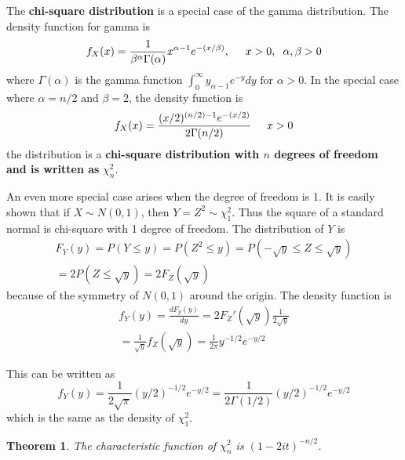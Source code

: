 \documentclass{article}
\newtheorem{theorem}{Theorem}[section]
\begin{document}
The \textbf{chi-square distribution} is a special case of the gamma distribution. The density function for gamma is
\begin{equation*}
    f_X(x)=\frac{1}{\beta^{\alpha}\Gamma(\alpha)}x^{\alpha-1}e^{-(x/\beta)}, \hspace{0.5cm} x>0, \hspace{0.2cm} \alpha,\beta>0
\end{equation*}
where \(\Gamma(\alpha)\) is the gamma function \(\int_0^{\infty}y_{\alpha-1}e^{-y}dy \text{ for } \alpha>0\). In the special case where \(\alpha=n/2 \text{ and } \beta=2\), the density function is
\begin{equation*}
    f_X(x)=\frac{(x/2)^{(n/2)-1}e^{-(x/2)}}{2 \Gamma(n/2)} \hspace{0.5cm} x>0
\end{equation*}
the distribution is a \textbf{chi-square distribution with $n$ degrees of freedom and is written as} \(\chi_n^{2}\).

An even more special case arises when the degree of freedom is 1. It is easily shown that if \(X\sim N(0,1)\), then \(Y=Z^2\sim\chi_1^2\). Thus the square of a standard normal is chi-square with 1 degree of freedom. The distribution of \(Y\) is
\begin{equation*}
\begin{split}
    F_Y(y)=P(Y \leq y) = P(Z^2 \leq y) = P(-\sqrt{y} \leq Z \leq \sqrt{y}) \\
    = 2P(Z \leq \sqrt{y})=2 F_Z(\sqrt{y})
\end{split}
\end{equation*}
because of the symmetry of \(N(0,1)\) around the origin. The density function is
\begin{equation*}
\begin{split}
    f_Y(y)=\frac{dF_y(y)}{dy}=2F_Z'(\sqrt{y})\frac{1}{2\sqrt{y}} \\
    = \frac{1}{\sqrt{y}}f_Z(\sqrt{y})=\frac{1}{2\pi}y^{-1/2}e^{-y/2} 
\end{split}
\end{equation*}

This can be written as
\begin{equation*}
    f_Y(y)=\frac{1}{2\sqrt{\pi}} (y/2)^{-1/2}e^{-y/2} = \frac{1}{2\Gamma(1/2)} (y/2)^{-1/2}e^{-y/2}
\end{equation*}
which is the same as the density of \(\chi_1^2\).

\begin{theorem}
    The characteristic function of \(\chi_n^2\) is \((1-2it)^{-n/2}\).
\end{theorem}
\end{document}

